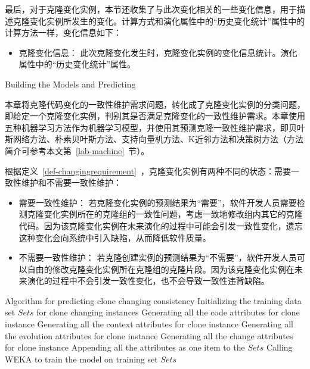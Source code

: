 最后，对于克隆变化实例，本节还收集了与此次变化相关的一些变化信息，用于描述克隆变化实例所发生的变化。计算方式和演化属性中的“历史变化统计”属性中的计算方法一样，变化信息如下：

\begin {itemize}
\item
克隆变化信息：
此次克隆变化发生时，克隆变化实例的变化信息统计。演化属性中的“历史变化统计”属性。
\end {itemize}


{Building the Models and Predicting} 

本章将克隆代码变化的一致性维护需求问题，转化成了克隆变化实例的分类问题，即给定一个克隆变化实例，判别其是否满足克隆变化的一致性维护需求。本章使用五种机器学习方法作为机器学习模型，并使用其预测克隆一致性维护需求，即贝叶斯网络方法、朴素贝叶斯方法、支持向量机方法、K近邻方法和决策树方法（方法简介可参考本文第~\ref{lab-machine}~节）。

根据定义~\ref{def-changingrequirement}~，克隆变化实例有两种不同的状态：需要一致性维护和不需要一致性维护：
\begin{itemize}
\item 
需要一致性维护：
若克隆变化实例的预测结果为“需要”，软件开发人员需要检测克隆变化实例所在的克隆组的一致性问题，考虑一致地修改组内其它的克隆代码。因为该克隆变化实例在未来演化的过程中可能会引发一致性变化，遗忘这种变化会向系统中引入缺陷，从而降低软件质量。
\item
不需要一致性维护：
若克隆创建实例的预测结果为“不需要”，软件开发人员可以自由的修改克隆变化实例所在克隆组的克隆片段。因为该克隆变化实例在未来演化的过程中不会引发一致性变化，也不会导致一致性违背缺陷。
\end{itemize}

\vspace{1em}
\begin{minipage}{0.8\textwidth}
\centering
\begin{algorithm}[H]
 {Algorithm for predicting clone changing consistency}
\label{alg-changingperdition}
Initializing the training data set $Sets$ for clone changing instances\; 
{ 
Generating all the code attributes for clone instance\;
Generating all the context attributes for clone instance\;
Generating all the evolution attributes for clone instance\;
Generating all the change attributes for clone instance\;
Appending all the attributes as one item to the $Sets$\;
}
Calling WEKA to train the model on training set $Sets$\;
\end{algorithm}
\end{minipage}
\vspace{1em}

